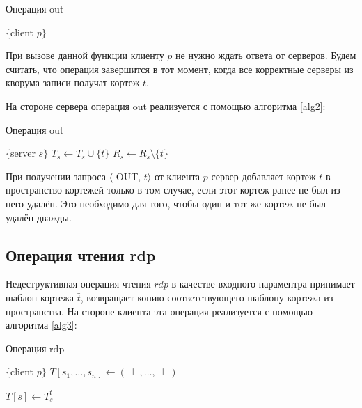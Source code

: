 \begin{algorithm}[H]
	\caption{Операция out}\label{alg1}
	\begin{algorithmic}[1]
		\Statex $\{$client $p \}$
			\State {}
		\EndFor
		\EndProcedure
	\end{algorithmic}
\end{algorithm}

При вызове данной функции клиенту $p$ не нужно ждать ответа от серверов. Будем считать, что операция завершится в тот момент, когда все корректные серверы из кворума записи получат кортеж $t$.

На стороне сервера операция out реализуется с помощью алгоритма \ref{alg2}:
	
\begin{algorithm}[H]
	\caption{Операция out}\label{alg2}
	\begin{algorithmic}[1]
		\Statex $\{$server $s \}$
				\State $T_s \gets T_s \cup \{t\}$
			\EndIf
			\State $R_s \gets R_s \setminus \{t\}$
		\EndUpon
	\end{algorithmic}
\end{algorithm}

При получении запроса $\langle$ OUT, $t \rangle$ от клиента $p$ сервер добавляет кортеж $t$ в пространство кортежей только в том случае, если этот кортеж ранее не был из него удалён. Это необходимо для того, чтобы один и тот же кортеж не был удалён дважды.

\subsection{Операция чтения rdp}\label{subsec5:2}
Недеструктивная операция чтения $rdp$ в качестве входного параментра принимает шаблон кортежа $\bar{t}$, возвращает копию соответствующего шаблону кортежа из пространства. На стороне клиента эта операция реализуется с помощью алгоритма \ref{alg3}:

\begin{algorithm}[H]
	\caption{Операция rdp}\label{alg3}
	\begin{algorithmic}[1]
		\Statex $\{$client $p \}$
		\State $T[s_1, \dots, s_n] \gets (\perp, \dots, \perp)$
		
		\State {}
		\EndFor
		
		\Repeat
		\State {}
		\State $T[s] \gets T_s^{\bar t}$
		
		\State {}
		\EndIf
		\State \Return{$\perp$}
		\EndFunction
	\end{algorithmic}
\end{algorithm}

